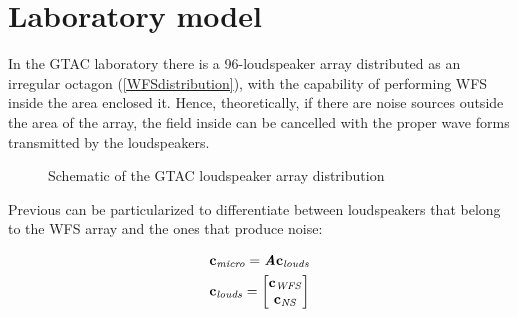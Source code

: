 \section{Laboratory model} \label{labModelSection}
In the GTAC laboratory there is a 96-loudspeaker array distributed as an irregular octagon (\autoref{WFSdistribution}), with the capability of performing WFS inside the area enclosed it. Hence, theoretically, if there are noise sources outside the area of the array, the field inside can be cancelled with the proper wave forms transmitted by the loudspeakers.

\begin{figure}
	\centering
	\caption[WFS array distribution]{Schematic of the GTAC loudspeaker array distribution}
	\label{WFSdistribution}
\end{figure}

Previous  can be particularized to differentiate between loudspeakers that belong to the WFS array and the ones that produce noise:

\begin{gather}
	\mathbf{c_\mathit{micro}} = \bm{\mathit{A}} \mathbf{c_\mathit{louds}} \\
	\mathbf{c_\mathit{louds}} = 
	\begin{bmatrix}
		\mathbf{c_\mathit{WFS}} \\
		\mathbf{c_\mathit{NS}}
	\end{bmatrix}
	\label{transEqMatrixRep1}
\end{gather}

%
%

